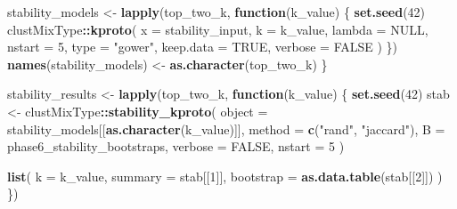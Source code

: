 \documentclass[
]{article}
\newenvironment{Shaded}{\begin{snugshade}}{\end{snugshade}}
\newcommand{\AttributeTok}[1]{\textcolor[rgb]{0.13,0.29,0.53}{#1}}
\newcommand{\ConstantTok}[1]{\textcolor[rgb]{0.56,0.35,0.01}{#1}}
\newcommand{\ControlFlowTok}[1]{\textcolor[rgb]{0.13,0.29,0.53}{\textbf{#1}}}
\newcommand{\DecValTok}[1]{\textcolor[rgb]{0.00,0.00,0.81}{#1}}
\newcommand{\FunctionTok}[1]{\textcolor[rgb]{0.13,0.29,0.53}{\textbf{#1}}}
\newcommand{\NormalTok}[1]{#1}
\newcommand{\OtherTok}[1]{\textcolor[rgb]{0.56,0.35,0.01}{#1}}
\newcommand{\SpecialCharTok}[1]{\textcolor[rgb]{0.81,0.36,0.00}{\textbf{#1}}}
\newcommand{\StringTok}[1]{\textcolor[rgb]{0.31,0.60,0.02}{#1}}
\begin{document}
\begin{Shaded}
\begin{Highlighting}[]
\NormalTok{    stability\_models }\OtherTok{\textless{}{-}} \FunctionTok{lapply}\NormalTok{(top\_two\_k, }\ControlFlowTok{function}\NormalTok{(k\_value) \{}
      \FunctionTok{set.seed}\NormalTok{(}\DecValTok{42}\NormalTok{)}
\NormalTok{      clustMixType}\SpecialCharTok{::}\FunctionTok{kproto}\NormalTok{(}
        \AttributeTok{x =}\NormalTok{ stability\_input,}
        \AttributeTok{k =}\NormalTok{ k\_value,}
        \AttributeTok{lambda =} \ConstantTok{NULL}\NormalTok{,}
        \AttributeTok{nstart =} \DecValTok{5}\NormalTok{,}
        \AttributeTok{type =} \StringTok{"gower"}\NormalTok{,}
        \AttributeTok{keep.data =} \ConstantTok{TRUE}\NormalTok{,}
        \AttributeTok{verbose =} \ConstantTok{FALSE}
\NormalTok{      )}
\NormalTok{    \})}
    \FunctionTok{names}\NormalTok{(stability\_models) }\OtherTok{\textless{}{-}} \FunctionTok{as.character}\NormalTok{(top\_two\_k)}
\NormalTok{  \}}

\NormalTok{  stability\_results }\OtherTok{\textless{}{-}} \FunctionTok{lapply}\NormalTok{(top\_two\_k, }\ControlFlowTok{function}\NormalTok{(k\_value) \{}
    \FunctionTok{set.seed}\NormalTok{(}\DecValTok{42}\NormalTok{)}
\NormalTok{    stab }\OtherTok{\textless{}{-}}\NormalTok{ clustMixType}\SpecialCharTok{::}\FunctionTok{stability\_kproto}\NormalTok{(}
      \AttributeTok{object =}\NormalTok{ stability\_models[[}\FunctionTok{as.character}\NormalTok{(k\_value)]],}
      \AttributeTok{method =} \FunctionTok{c}\NormalTok{(}\StringTok{"rand"}\NormalTok{, }\StringTok{"jaccard"}\NormalTok{),}
      \AttributeTok{B =}\NormalTok{ phase6\_stability\_bootstraps,}
      \AttributeTok{verbose =} \ConstantTok{FALSE}\NormalTok{,}
      \AttributeTok{nstart =} \DecValTok{5}
\NormalTok{    )}

    \FunctionTok{list}\NormalTok{(}
      \AttributeTok{k =}\NormalTok{ k\_value,}
      \AttributeTok{summary =}\NormalTok{ stab[[}\DecValTok{1}\NormalTok{]],}
      \AttributeTok{bootstrap =} \FunctionTok{as.data.table}\NormalTok{(stab[[}\DecValTok{2}\NormalTok{]])}
\NormalTok{    )}
\NormalTok{  \})}


\end{Highlighting}
\end{Shaded}
\end{document}
